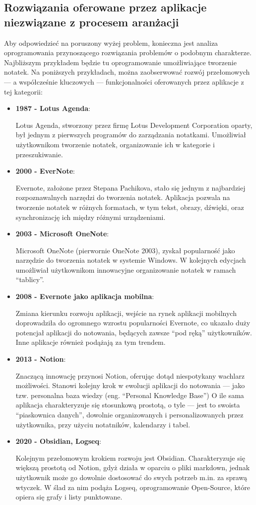 \subsection{Rozwiązania oferowane przez aplikacje niezwiązane z procesem aranżacji}
Aby odpowiedzieć na poruszony wyżej problem, konieczna jest analiza oprogramowania przynoszącego rozwiązania problemów
o podobnym charakterze. Najbliższym przykładem będzie tu oprogramowanie umożliwiające tworzenie notatek.
Na poniższych przykładach, można zaobserwować rozwój przełomowych — a współcześnie kluczowych — funkcjonalności oferowanych
przez aplikacje z tej kategorii:
\begin{itemize}
	\item \textbf{1987 - Lotus Agenda}:

	      Lotus Agenda, stworzony przez firmę Lotus Development Corporation oparty, był jednym z pierwszych programów do
	      zarządzania notatkami.
	      Umożliwiał użytkownikom tworzenie notatek, organizowanie ich w kategorie i przeszukiwanie.
	\item \textbf{2000 - EverNote}:

	      Evernote, założone przez Stepana Pachikova, stało się jednym z najbardziej rozpoznawalnych narzędzi do tworzenia
	      notatek.
	      Aplikacja pozwala na tworzenie notatek w różnych formatach, w tym tekst, obrazy, dźwięki,
	      oraz synchronizację ich między różnymi urządzeniami.
	\item \textbf{2003 - Microsoft OneNote}:

	      Microsoft OneNote (pierwornie OneNote 2003), zyskał popularność jako narzędzie do tworzenia notatek w systemie
	      Windows.
	      W kolejnych edycjach umożliwiał użytkownikom innowacyjne organizowanie notatek w ramach \enquote{tablicy}.
	\item \textbf{2008 - Evernote jako aplikacja mobilna}:

	      Zmiana kierunku rozwoju aplikacji, wejście na rynek aplikacji mobilnych doprowadziła do ogromnego wzrostu popularności Evernote,
	      co ukazało duży potencjał aplikacji do notowania, będących zawsze \enquote{pod ręką} użytkowników.
	      Inne aplikacje również podążają za tym trendem.
	\item \textbf{2013 - Notion}:

	      Znaczącą innowację przynosi Notion, oferując dotąd niespotykany wachlarz możliwości.
	      Stanowi kolejny krok w ewolucji aplikacji do notowania — jako tzw. personalna baza wiedzy (eng.
	      \enquote{Personal Knowledge Base})
	      O ile sama aplikacja charakteryzuje się stosunkową prostotą, o tyle — jest to swoista \enquote{piaskownica danych},
	      dowolnie organizowanych i personalizowanych przez użytkownika, przy użyciu notatników, kalendarzy i tabel.
	\item \textbf{2020 - Obsidian, Logseq}:

	      Kolejnym przełomowym krokiem rozwoju jest Obsidian. Charakteryzuje się większą prostotą od Notion,
	      gdyż działa w oparciu o pliki markdown, jednak użytkownik może go dowolnie dostosować do swych potrzeb m.in.
	      za sprawą
	      wtyczek. W ślad za nim podąża Logseq, oprogramowanie Open-Source, które opiera się grafy i listy punktowane.
\end{itemize}
